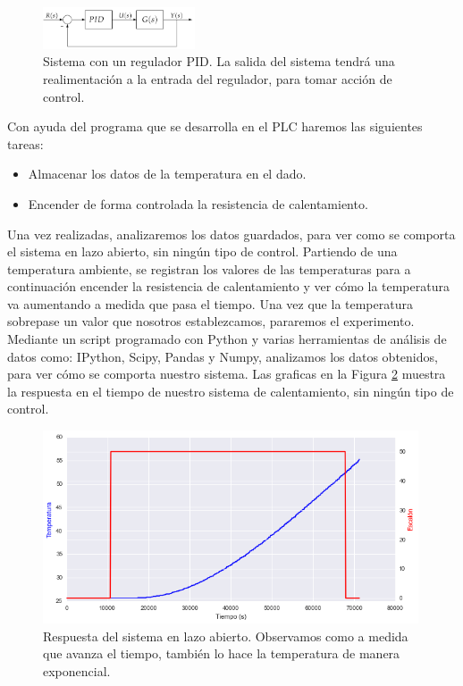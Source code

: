 \begin{figure}[H]
    \centering
    \includegraphics[width=0.4\textwidth]{images/PLC/sistema.png}
    \caption[Sistema con un regulador PID.]{Sistema con un regulador PID. La salida del sistema tendrá una realimentación a la entrada del regulador, para tomar acción de control.}
    \label{fig:plc_sistema}
\end{figure}

Con ayuda del programa que se desarrolla en el PLC haremos las siguientes tareas:

\begin{itemize}
    \item{Almacenar los datos de la temperatura en el dado.}
    \item{Encender de forma controlada la resistencia de calentamiento.}
\end{itemize}

Una vez realizadas, analizaremos los datos guardados, para ver como se comporta el sistema en lazo abierto, sin ningún tipo de control. Partiendo de una temperatura ambiente, se registran los valores de las temperaturas para a continuación encender la resistencia de calentamiento y ver cómo la temperatura va aumentando a medida que pasa el tiempo. Una vez que la temperatura sobrepase un valor que nosotros establezcamos, pararemos el experimento.\\

Mediante un script programado con Python y varias herramientas de análisis de datos como: IPython, Scipy, Pandas y Numpy, analizamos los datos obtenidos, para ver cómo se comporta nuestro sistema. Las graficas en la Figura \ref{fig:plc_lazo_abierto} muestra la respuesta en el tiempo de nuestro sistema de calentamiento, sin ningún tipo de control.

\begin{figure}[H]
    \centering
    \includegraphics[width=0.99\textwidth]{images/PLC/modelado/modelado_9_1.png}
    \caption[Respuesta del sistema en lazo abierto]{Respuesta del sistema en lazo abierto. Observamos como a medida que avanza el tiempo, también lo hace la temperatura de manera exponencial.}
    \label{fig:plc_lazo_abierto}
\end{figure}

